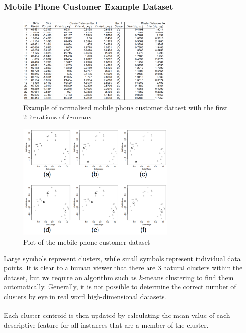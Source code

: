 \documentclass[a4paper,11pt]{article}
\begin{document}
\subsubsection{Mobile Phone Customer Example Dataset}
\begin{figure}[H]
    \centering
    \includegraphics[width=0.7\textwidth]{images/mobilephonecustomer.png}
    \caption{ Example of normalised mobile phone customer dataset with the first 2 iterations of $k$-means }
\end{figure}

\begin{figure}[H]
    \centering
    \includegraphics[width=0.7\textwidth]{images/mobilephonecustomerplot.png}
    \caption{ Plot of the mobile phone customer dataset }
\end{figure}

Large symbols represent clusters, while small symbols represent individual data points.
It is clear to a human viewer that there are 3 natural clusters within the dataset, but we require an algorithm such as $k$-means clustering to find them automatically.
Generally, it is not possible to determine the correct number of clusters by eye in real word high-dimensional datasets.
\\\\
Each cluster centroid is then updated by calculating the mean value of each descriptive feature for all instances that are a member of the cluster. 
\end{document}
